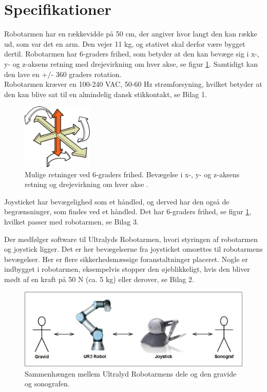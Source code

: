 \newpage
\section{Specifikationer}
Robotarmen har en rækkevidde på 50 cm, der angiver hvor langt den kan række ud, som var det en arm. Den vejer 11 kg, og stativet skal derfor være bygget dertil. Robotarmen har 6-graders frihed, som betyder at den kan bevæge sig i x-, y- og z-aksens retning med drejevirkning om hver akse, se figur \ref{seksgradersfrihed}. Samtidigt kan den lave en +/- 360 graders rotation. \\
Robotarmen kræver en 100-240 VAC, 50-60 Hz strømforsyning, hvilket betyder at den kan blive sat til en almindelig dansk stikkontakt, se Bilag 1.
\begin{figure}[H]\centering
	\includegraphics[width = 0.3\textwidth]{Figurer/sixDegressOfFreedom.jpg}
	\caption{Mulige retninger ved 6-graders frihed. Bevægelse i x-, y- og z-aksens retning og drejevirkning om hver akse \cite{6gradersfrihed}. }
	\label{seksgradersfrihed}
\end{figure}
Joysticket har bevægelighed som et håndled, og derved har den også de begrænsninger, som findes ved et håndled. Det har 6-graders frihed, se figur \ref{seksgradersfrihed}, hvilket passer med robotarmen, se Bilag 3. 

Der medfølger software til Ultralyds Robotarmen, hvori styringen af robotarmen og joystick ligger. Det er her bevægelserne fra joysticket omsættes til robotarmens bevægelser. Her er flere sikkerhedsmæssige foranstaltninger placeret. Nogle er indbygget i robotarmen, eksempelvis stopper den øjeblikkeligt, hvis den bliver mødt af en kraft på 50 N (ca. 5 kg) eller derover, se Bilag 2.    

\begin{figure}[H]\centering
	\includegraphics[width = 1.0\textwidth]{Figurer/teknologi.jpg}
	\caption{Sammenhængen mellem Ultralyd Robotarmens dele og den gravide og sonografen.}
	\label{system}
\end{figure}

